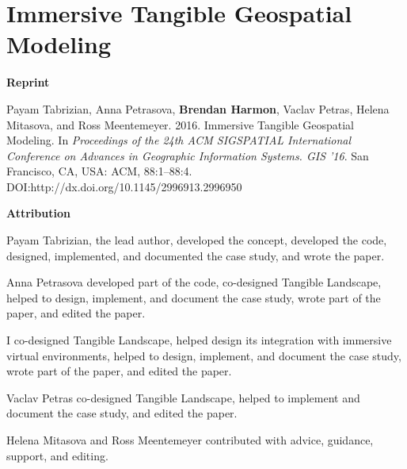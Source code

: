 \chapter{Immersive Tangible Geospatial Modeling}
\label{app-d}

\textbf{Reprint}

Payam Tabrizian, Anna Petrasova, \textbf{Brendan Harmon}, Vaclav Petras, Helena Mitasova, and Ross Meentemeyer. 2016. Immersive Tangible Geospatial Modeling. In \emph{Proceedings of the 24th ACM SIGSPATIAL International Conference on Advances in Geographic Information Systems. GIS ’16}. San Francisco, CA, USA: ACM, 88:1--88:4. DOI:http://dx.doi.org/10.1145/2996913.2996950

\textbf{Attribution} 
 
Payam Tabrizian, the lead author, 
developed the concept,
developed the code, 
designed, implemented, and documented the case study,
and wrote the paper.

Anna Petrasova
developed part of the code, 
co-designed Tangible Landscape,
helped to design, implement, and document the case study, 
wrote part of the paper,
and edited the paper.

I co-designed Tangible Landscape,
helped design its integration with immersive virtual environments,
helped to design, implement, and document the case study,
wrote part of the paper,
and edited the paper.

Vaclav Petras co-designed Tangible Landscape,
helped to implement and document the case study,
and edited the paper.

Helena Mitasova and Ross Meentemeyer
contributed with advice, guidance, support, and editing.

\vfil
\pagebreak

%


